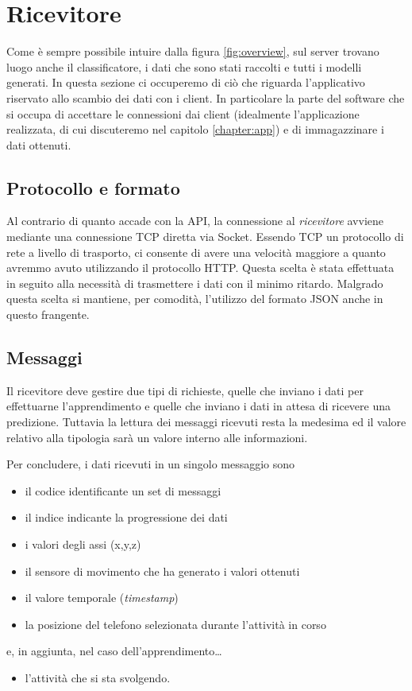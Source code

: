 \section{Ricevitore}
\label{section:receiver}
Come è sempre possibile intuire dalla figura \ref{fig:overview}, sul server trovano luogo anche il classificatore, 
i dati che sono stati raccolti e tutti i modelli generati. 
In questa sezione ci occuperemo di ciò che riguarda l'applicativo riservato allo scambio dei dati con i client. In particolare
la parte del software che si occupa di accettare le connessioni dai client (idealmente l'applicazione realizzata, di cui 
discuteremo nel capitolo \ref{chapter:app}) e di immagazzinare i dati ottenuti.

\subsection{Protocollo e formato}
Al contrario di quanto accade con la API, la connessione al \textit{ricevitore} avviene mediante una connessione 
TCP diretta via Socket.
Essendo TCP un protocollo di rete a livello di trasporto, ci consente di avere una velocità maggiore a quanto avremmo avuto 
utilizzando il protocollo HTTP. Questa scelta è stata effettuata in seguito alla necessità di trasmettere i dati
con il minimo ritardo.
Malgrado questa scelta si mantiene, per comodità, l'utilizzo del formato JSON anche in questo frangente.


\subsection{Messaggi}
Il ricevitore deve gestire due tipi di richieste, quelle che inviano i dati per effettuarne l'apprendimento e quelle che inviano
i dati in attesa di ricevere una predizione. Tuttavia la lettura dei messaggi ricevuti resta la medesima ed il 
valore relativo alla tipologia sarà un valore interno alle informazioni.

Per concludere, i dati ricevuti in un singolo messaggio sono
\begin{itemize}
    \item il codice identificante un set di messaggi
    \item il indice indicante la progressione dei dati
    \item i valori degli assi (x,y,z)
    \item il sensore di movimento che ha generato i valori ottenuti
    \item il valore temporale (\textit{timestamp})
    \item la posizione del telefono selezionata durante l'attività in corso
\end{itemize}
e, in aggiunta, nel caso dell'apprendimento\dots
\begin{itemize}
    \item l'attività che si sta svolgendo.
\end{itemize}

